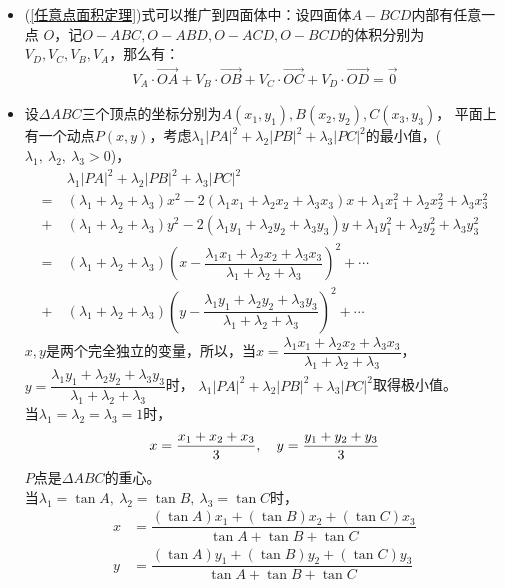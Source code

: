 \begin{itemize}[leftmargin=\inteval{\myitemleftmargin}pt,itemsep=
   \inteval{\myitemitempsep}pt,topsep=\inteval{\myitemtopsep}pt]
\item (\ref{任意点面积定理})式可以推广到四面体中：设四面体$ A-BCD $内部有任意一点
$ O $，记$  O-ABC,O-ABD,O-ACD,O-BCD $的体积分别为$V_D,V_C,V_B,V_A $，那么有：
\begin{align*}
    V_A\cdot\vec{OA}+ V_B\cdot\vec{OB}
    +V_C\cdot\vec{OC}+V_D\cdot\vec{OD}= \vec{0}
\end{align*}

\item 设$ \Delta ABC $三个顶点的坐标分别为$ A(x_1,y_1),B(x_2,y_2),C(x_3,y_3) $，
平面上有一个动点$ P(x,y) $，考虑$ \lambda_1|PA|^2+\lambda_2|PB|^2+
\lambda_3|PC|^2 $的最小值，($ \lambda_1,\ \lambda_2,\ \lambda_3>0 $)，
\begin{align*}
    &\ \lambda_1|PA|^2+\lambda_2|PB|^2+\lambda_3|PC|^2 \\
    =&\ (\lambda_1+\lambda_2+\lambda_3)x^2-2(\lambda_1x_1+\lambda_2x_2
    +\lambda_3x_3)x+\lambda_1x_1^2+\lambda_2x_2^2+\lambda_3x_3^2 \\ 
    +&\ (\lambda_1+\lambda_2+\lambda_3)y^2
    -2(\lambda_1y_1+\lambda_2y_2+\lambda_3y_3)y+
    \lambda_1y_1^2+\lambda_2y_2^2+\lambda_3y_3^2 \\
    =&\ (\lambda_1+\lambda_2+\lambda_3)\left(x-\dfrac{\lambda_1x_1+
        \lambda_2x_2+\lambda_3x_3}{\lambda_1
        +\lambda_2+\lambda_3}\right)^2+\cdots \\
    +&\ (\lambda_1+\lambda_2+\lambda_3)\left(y-\dfrac{\lambda_1y_1
        +\lambda_2y_2+\lambda_3y_3}{
        \lambda_1+\lambda_2+\lambda_3}\right)^2+ \cdots
\end{align*}
$ x,y $是两个完全独立的变量，所以，当$ x=\dfrac{\lambda_1x_1+\lambda_2x_2+
    \lambda_3x_3}{\lambda_1+\lambda_2+\lambda_3} $，$ y=\dfrac{\lambda_1y_1+
    \lambda_2y_2+\lambda_3y_3}{\lambda_1+\lambda_2+\lambda_3} $时，
$ \lambda_1|PA|^2+\lambda_2|PB|^2+\lambda_3|PC|^2 $取得极小值。\\
 当$ \lambda_1=\lambda_2=\lambda_3=1 $时，
\begin{gather*}
    x=\dfrac{x_1+x_2+x_3}{3},\quad y=\dfrac{y_1+y_2+y_3}{3}
\end{gather*}
$ P $点是$ \Delta ABC $的重心。\\
 当$ \lambda_1=\tan A,\ \lambda_2=\tan B,\ \lambda_3=
\tan C $时，
\begin{align*}
    x &=\dfrac{(\tan A)x_1+(\tan B)x_2+(\tan C)x_3}{\tan A+\tan B+
        \tan C} \\ 
    y &=\dfrac{(\tan A)y_1+(\tan B)y_2+(\tan C)y_3}{\tan A+\tan B+
        \tan C}
\end{align*}

\end{itemize}
